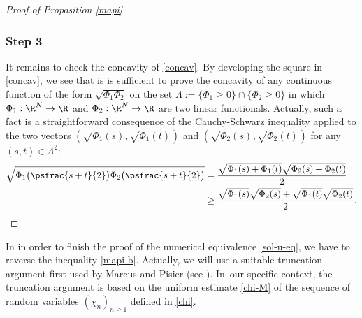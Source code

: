 \begin{proof}[Proof of Proposition \ref{mapi}]
\subsubsection*{Step 3} It remains to check the concavity of \eqref{concav}. By developing the square in \eqref{concav}, we see that is is sufficient to prove the concavity of any continuous function of the form $\sqrt{\Phi_1 \Phi_2}$ on the set $\Lambda:=\{\Phi_1\geq 0\}\cap\{\Phi_2\geq 0\}$ in which $\Phi_1:\R^N\to \R$ and $\Phi_2:\R^N\to \R$ are two linear functionals. Actually, such a fact is a straightforward consequence of the Cauchy-Schwarz inequality applied to the
two vectors $(\sqrt{\Phi_1(s)},\sqrt{\Phi_1(t)})$ and $(\sqrt{\Phi_2(s)},\sqrt{\Phi_2(t)})$
for any $(s,t)\in \Lambda^2$:
\begin{align*}
\sqrt{\Phi_1\bigl(\psfrac{s+t}{2}\bigr)\Phi_2\bigl(\psfrac{s+t}{2}\bigr)}&=\frac{\sqrt{\Phi_1(s)+\Phi_1(t)}\sqrt{\Phi_2(s)+\Phi_2(t)}}{2} \\
& \geq \frac{\sqrt{\Phi_1(s)}\sqrt{\Phi_2(s)}+\sqrt{\Phi_1(t)}\sqrt{\Phi_2(t)}}{2}.\qedhere
\end{align*}
\end{proof}

In in order to finish the proof of the numerical equivalence \eqref{sol-u-eq}, we have to reverse the inequality \eqref{mapi-b}.
Actually, we will use a suitable truncation argument first used by Marcus and Pisier (see \cite[p.\, 53-54, proof of Lem.\,1.1 \& p.\,99, Lem.\,3.7]{pisier1981}).
In~our specific context, the truncation argument is based on the uniform estimate \eqref{chi-M} of the sequence of random variables $(\chi_n)_{n\geq 1}$ defined in \eqref{chi}.

